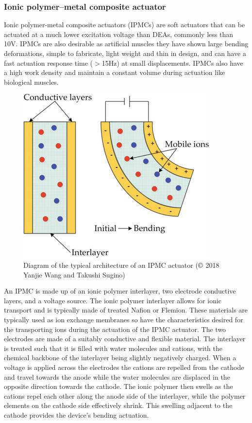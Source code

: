 \subsubsection{Ionic polymer–metal composite actuator}
Ionic polymer-metal composite actuators (IPMCs) are soft actuators that can be actuated at a much lower excitation voltage than DEAs, commonly less than 10V. IPMCs are also desirable as artificial muscles they have shown large bending deformations, simple to fabricate, light weight and thin in design, and can have a fast actuation response time ($>$15Hz) at small displacements\citep{Ma2020}. IPMCs also have a high work density and maintain a constant volume during actuation like biological muscles\cite{Neuhaus2020}.
\begin{figure}[h!]
  \centering
  \includegraphics[width=0.5\linewidth]{Figures/IPMC.png}
  \caption{Diagram of the typical architecture of an IPMC actuator\citep{Yanjie2018} ($\copyright$ 2018 Yanjie Wang and Takushi Sugino)}
  \label{fig:Artificial Muscle_IPMC}
\end{figure}
An IPMC is made up of an ionic polymer interlayer, two electrode conductive layers, and a voltage source. The ionic polymer interlayer allows for ionic transport and is typically made of treated Nafion or Flemion. These materials are typically used as ion exchange membranes so have the characteristics desired for the transporting ions during the actuation of the IPMC actuator. The two electrodes are made of a suitably conductive and flexible material. The interlayer is treated such that it is filled with water molecules and cations, with the chemical backbone of the interlayer being slightly negatively charged. When a voltage is applied across the electrodes the cations are repelled from the cathode and travel towards the anode while the water molecules are displaced in the opposite direction towards the cathode. The ionic polymer then swells as the cations repel each other along the anode side of the interlayer, while the polymer elements on the cathode side effectively shrink\citep{Segalman1999}. This swelling adjacent to the cathode provides the device's bending actuation.

